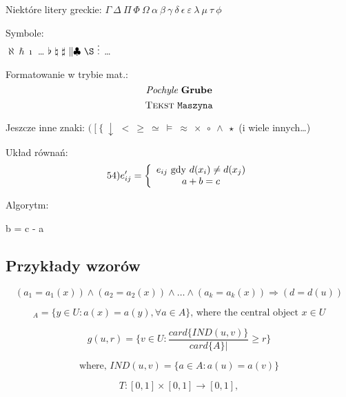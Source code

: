 ﻿\documentclass[a4paper,12pt]{article}
\begin{document}
Niektóre litery greckie: $ \Gamma \ \Delta \ \Pi \ \Phi \ \Omega \ \alpha \
 \beta \ \gamma \ \delta \ \epsilon \ \varepsilon \ \lambda \ \mu \ \tau \ 
\phi$


Symbole:\\
$ \aleph \ \hbar \ \imath $ \dots 
$ \flat \ \natural \ \sharp \ \| \clubsuit \ \S \ \vdots $ \dots 


Formatowanie w trybie mat.: \\
$$	\emph{Pochyle} \ \textbf{Grube}$$
$$ \textsc{Tekst} \ \verb"Maszyna"	$$

Jeszcze inne znaki:
$ ( \ [ \ \{ \ \downarrow $
$ < \ \geq \ \simeq \ \models \ \approx \ \times \ \circ \ \wedge \ \star$
(i wiele innych\dots)

Układ równań:
$$54) e'_{ij}= 
\left \{ 
			\begin{array}{c}
			e_{ij} \ {\rm gdy}\ d(x_i) \neq d(x_j) \\
			a + b = c\\
\end{array}
\right. $$

Algorytm:
\begin{algorithmic}
\item{b = c - a}
\EndIf
\end{algorithmic}

\subsection{Przykłady wzorów}

\begin{displaymath}
(a_1=a_1(x)) \wedge (a_2=a_2(x)) \wedge \dots \wedge
(a_k=a_k(x)) \Rightarrow (d=d(u))
\end{displaymath}

\begin{displaymath}
	[x]_A=\{y\in{}U:a(x)=a(y),\forall{}a\in{}A\}
	\textrm{, where the central
	object }x\in{}U
\end{displaymath}

\begin{displaymath}
	g(u,r)=\{v\in{}U:\frac{card\{IND(u,v)\}}
	{card\{A\}|}\geq{}r\}
\end{displaymath}

\begin{displaymath}
	\textrm{where, }IND(u,v)=\{a\in{}A:a(u)=a(v)\}
\end{displaymath}

\begin{displaymath}
	T:[0,1]\times[0,1]\rightarrow[0,1],
\end{displaymath}
\end{document}
